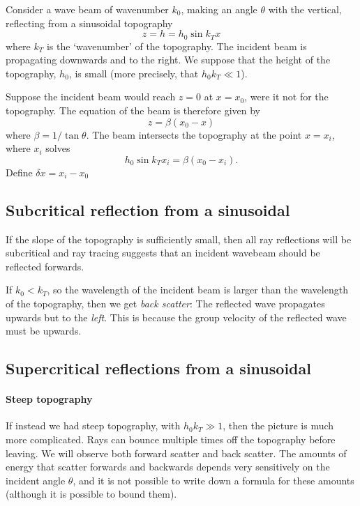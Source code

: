 Consider a wave beam of wavenumber $k_0$, making an angle $\theta$ with the
vertical, reflecting from a sinusoidal topography
\begin{equation}
    z = h = h_0 \sin k_T x
\end{equation}
where $k_T$ is the `wavenumber' of the topography. The incident beam is
propagating downwards and to the right. We suppose that the height of the
topography, $h_0$, is small (more precisely, that $h_0 k_T \ll 1$).

Suppose the incident beam would reach $z = 0$ at $x = x_0$, were it not for the
topography. The equation of the beam is therefore given by
\begin{equation}
    z = \beta (x_0 - x)
\end{equation}
where $\beta = 1/\tan \theta$. The beam intersects the topography at the point
$x = x_i$, where $x_i$ solves
\begin{equation}
    h_0 \sin k_T x_i = \beta (x_0 - x_i).
\end{equation}
Define $\delta x = x_i - x_0$

\subsection{Subcritical reflection from a sinusoidal}

If the slope of the topography is sufficiently small, then all ray reflections
will be subcritical and ray tracing suggests that an incident wavebeam should be
reflected forwards. 

If $k_0 < k_T$, so the wavelength of the incident beam is larger than the
wavelength of the topography, then we get \textit{back scatter}: The reflected
wave propagates upwards but to the \textit{left}. This is because the group
velocity of the reflected wave must be upwards.

\subsection{Supercritical reflections from a sinusoidal}

\paragraph{Steep topography} If instead we had steep topography, with $h_0 k_T
\gg 1$, then the picture is much more complicated. Rays can bounce multiple
times off the topography before leaving. We will observe both forward scatter
and back scatter. The amounts of energy that scatter forwards and backwards
depends very sensitively on the incident angle $\theta$, and it is not possible
to write down a formula for these amounts (although it is possible to bound
them).

